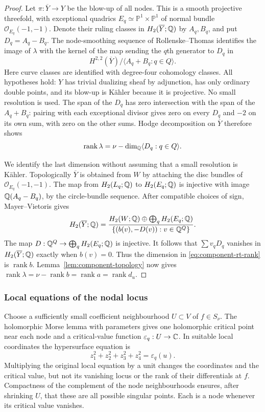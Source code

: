 \begin{proof}
Let $\pi:\overline Y\to Y$ be the blow-up of all nodes. This is a
smooth projective threefold, with exceptional quadrics
$E_q\simeq\mathbb P^1\times\mathbb P^1$ of normal bundle
$\mathcal O_{E_q}(-1,-1)$. Denote their ruling classes in
$H_2(\overline Y;\mathbb Q)$ by $A_q,B_q$, and put $D_q=A_q-B_q$.
The node-smoothing sequence of Rollenske--Thomas
\cite[\S2 and (3.2)]{RT09} identifies the image of $\lambda$ with the
kernel of the map sending the $q$th generator to $D_q$ in
\[
 H^{2,2}(\overline Y)\big/\langle A_q+B_q:q\in Q\rangle.
\]
Here curve classes are identified with degree-four cohomology classes.
All hypotheses hold: $Y$ has trivial dualizing sheaf by adjunction,
has only ordinary double points, and its blow-up is K\"ahler because it
is projective. No small resolution is used.
The span of the $D_q$ has zero intersection with the span of the
$A_q+B_q$: pairing with each exceptional divisor gives zero on every
$D_q$ and $-2$ on its own sum, with zero on the other sums.
Hodge decomposition on $\overline Y$ therefore shows
\begin{equation}\label{eq:component-rt-rank}
 \operatorname{rank}\lambda=\nu-\dim_{\mathbb Q}\langle D_q:q\in Q\rangle.
\end{equation}

We identify the last dimension without assuming that a small resolution
is K\"ahler. Topologically $\overline Y$ is obtained from $W$ by
attaching the disc bundles of $\mathcal O_{E_q}(-1,-1)$. The map from
$H_2(L_q;\mathbb Q)$ to $H_2(E_q;\mathbb Q)$ is injective with image
$\mathbb Q(A_q-B_q)$, by the circle-bundle sequence. After compatible choices
of sign, Mayer--Vietoris gives
\[
 H_2(\overline Y;\mathbb Q)=
 \frac{H_2(W;\mathbb Q)\oplus\bigoplus_qH_2(E_q;\mathbb Q)}
 {\{(b(v),-D(v)):v\in\mathbb Q^Q\}}.
\]
The map $D:\mathbb Q^Q\to\bigoplus_qH_2(E_q;\mathbb Q)$ is injective.
It follows that $\sum v_qD_q$ vanishes in $H_2(\overline Y;\mathbb Q)$
exactly when $b(v)=0$. Thus the dimension in \eqref{eq:component-rt-rank}
is $\operatorname{rank} b$. Lemma~\ref{lem:component-topology} now gives
$\operatorname{rank}\lambda=\nu-\operatorname{rank} b=\operatorname{rank} a=\operatorname{rank} d_u$.
\end{proof}

\subsubsection*{Local equations of the nodal locus}

Choose a sufficiently small coefficient neighbourhood $U\subset V$ of
$f\in S_\nu$. The holomorphic Morse lemma with parameters gives one
holomorphic critical point near each node and a critical-value function
$\varepsilon_q:U\to\mathbb C$. In suitable local coordinates the hypersurface
equation is
\begin{equation}\label{eq:component-morse}
 z_1^2+z_2^2+z_3^2+z_4^2=\varepsilon_q(u).
\end{equation}
Multiplying the original local equation by a unit changes the
coordinates and the critical value, but not its vanishing locus or the
rank of their differentials at $f$. Compactness of the complement of
the node neighbourhoods ensures, after shrinking $U$, that these are
all possible singular points. Each is a node whenever its critical
value vanishes.


